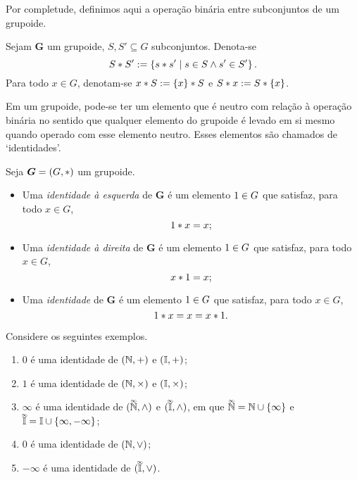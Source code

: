 Por completude, definimos aqui a operação binária entre subconjuntos de um grupoide.

\begin{definition}
Sejam $\bm G$ um grupoide, $S,S' \subseteq G$ subconjuntos. Denota-se
	\begin{equation*}
	S \ast S' := \left\{{s \ast s'}\;\middle\vert\;{s \in S \land s' \in S'}\right\}.
	\end{equation*}
Para todo $x \in G$, denotam-se $x \ast S := \{x\} \ast S$ e $S \ast x := S \ast \{x\}$.
\end{definition}

Em um grupoide, pode-se ter um elemento que é neutro com relação à operação binária no sentido que qualquer elemento do grupoide é levado em si mesmo quando operado com esse elemento neutro. Esses elementos são chamados de `identidades'.

\begin{definition}[Identidade]
Seja $\bm G=(G,\ast)$ um grupoide.
	\begin{itemize}
	\item Uma \emph{identidade à esquerda} de $\bm G$ é um elemento $1 \in G$ que satisfaz, para todo $x \in G$,
		\begin{equation*}
		1 \ast x = x;
		\end{equation*}
	\item Uma \emph{identidade à direita} de $\bm G$ é um elemento $1 \in G$ que satisfaz, para todo $x \in G$,
		\begin{equation*}
		x \ast 1 = x;
		\end{equation*}
	\item Uma \emph{identidade} de $\bm G$ é um elemento $1 \in G$ que satisfaz, para todo $x \in G$,
		\begin{equation*}
		1 \ast x = x = x \ast 1.
		\end{equation*}
	\end{itemize}
\end{definition}

\begin{example}
Considere os seguintes exemplos.
	\begin{enumerate}
	\item $0$ é uma identidade de $(\mathbb{N},+)$ e $(\mathbb{I},+)$;
	\item $1$ é uma identidade de $(\mathbb{N},\times)$ e $(\mathbb{I},\times)$;
	\item $\infty$ é uma identidade de $(\accentset{\infty}{\mathbb{N}},\mathbin{\wedge})$ e $(\accentset{\infty}{\mathbb{I}},\mathbin{\wedge})$, em que $\accentset{\infty}{\mathbb{N}} = \mathbb{N} \cup \{\infty\}$ e $\accentset{\infty}{\mathbb{I}} = \mathbb{I} \cup \{\infty,-\infty\}$;
	\item $0$ é uma identidade de $(\mathbb{N},\mathbin{\vee})$;
	\item $-\infty$ é uma identidade de $(\accentset{\infty}{\mathbb{I}},\mathbin{\vee})$.
	\end{enumerate}
\end{example}

